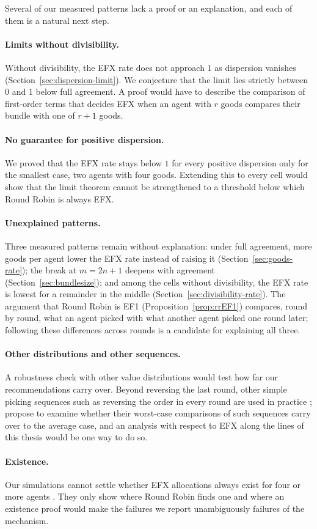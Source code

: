 Several of our measured patterns lack a proof or an explanation, and each of them is a natural
next step.

\paragraph{Limits without divisibility.}
Without divisibility, the EFX rate does not approach $1$ as dispersion vanishes
(Section~\ref{sec:dispersion-limit}). We conjecture that the limit lies strictly between $0$ and
$1$ below full agreement. A proof would have to describe the comparison of first-order terms that
decides EFX when an agent with $r$ goods compares their bundle with one of $r+1$ goods.

\paragraph{No guarantee for positive dispersion.}
We proved that the EFX rate stays below $1$ for every positive dispersion only for the smallest
case, two agents with four goods. Extending this to every cell would show that the limit theorem
cannot be strengthened to a threshold below which Round Robin is always EFX.

\paragraph{Unexplained patterns.}
Three measured patterns remain without explanation: under full agreement, more goods per agent
lower the EFX rate instead of raising it (Section~\ref{sec:goods-rate}); the break at $m=2n+1$
deepens with agreement (Section~\ref{sec:bundlesize}); and among the cells without divisibility,
the EFX rate is lowest for a remainder in the middle (Section~\ref{sec:divisibility-rate}). The
argument that Round Robin is EF1 (Proposition~\ref{prop:rrEF1}) compares, round by round, what an
agent picked with what another agent picked one round later; following these differences across
rounds is a candidate for explaining all three.

\paragraph{Other distributions and other sequences.}
A robustness check with other value distributions would test how far our recommendations carry
over. Beyond reversing the last round, other simple picking sequences such as reversing the order
in every round are used in practice \parencite[p.~1065]{budish2011}; \textcite[Conclusion]{celine2026}
propose to examine whether their worst-case comparisons of such sequences carry over to the
average case, and an analysis with respect to EFX along the lines of this thesis would be one way
to do so.

\paragraph{Existence.}
Our simulations cannot settle whether EFX allocations always exist for four or more agents
\parencite[Open Problem~2]{amanatidis2023survey}. They only show where Round Robin finds one and
where an existence proof would make the failures we report unambiguously failures of the
mechanism.
